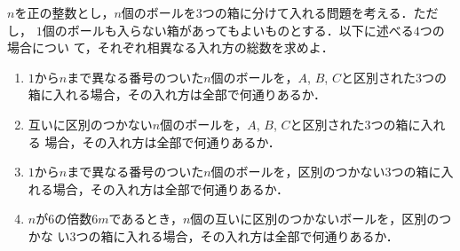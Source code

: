 $n$を正の整数とし，$n$個のボールを$3$つの箱に分けて入れる問題を考える．ただし，
$1$個のボールも入らない箱があってもよいものとする．以下に述べる$4$つの場合につい
て，それぞれ相異なる入れ方の総数を求めよ．

\begin{enumerate}
  \item $1$から$n$まで異なる番号のついた$n$個のボールを，$A$, $B$, $C$と区別された$3$つの
        箱に入れる場合，その入れ方は全部で何通りあるか．

  \item 互いに区別のつかない$n$個のボールを，$A$, $B$, $C$と区別された$3$つの箱に入れる
        場合，その入れ方は全部で何通りあるか．

  \item $1$から$n$まで異なる番号のついた$n$個のボールを，区別のつかない$3$つの箱に入
        れる場合，その入れ方は全部で何通りあるか．

  \item $n$が$6$の倍数$6m$であるとき，$n$個の互いに区別のつかないボールを，区別のつかな
        い$3$つの箱に入れる場合，その入れ方は全部で何通りあるか．
\end{enumerate}